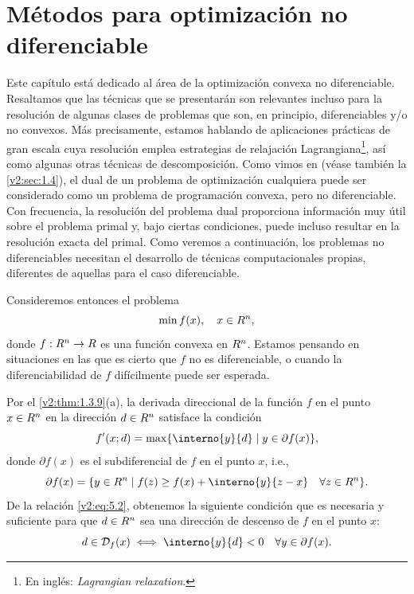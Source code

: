 
\chapter{Métodos para optimización no diferenciable}
\label{v2:chap:5}

Este capítulo está dedicado al área de la optimización convexa no diferenciable. Resaltamos que las técnicas que se presentarán son relevantes incluso para la resolución de algunas clases de problemas que son, en principio, diferenciables y/o no convexos. Más precisamente, estamos hablando de aplicaciones prácticas de gran escala cuya resolución emplea estrategias de relajación Lagrangiana\footnote{En inglés: \textit{Lagrangian relaxation}.}, así como algunas otras técnicas de descomposición. Como vimos en \cite[Capítulo 5]{SolodovVol1} (véase también la \cref{v2:sec:1.4}), el dual de un problema de optimización cualquiera puede ser considerado como un problema de programación convexa, pero no diferenciable. Con frecuencia, la resolución del problema dual proporciona información muy útil sobre el problema primal y, bajo ciertas condiciones, puede incluso resultar en la resolución exacta del primal. Como veremos a continuación, los problemas no diferenciables necesitan el desarrollo de técnicas computacionales propias, diferentes de aquellas para el caso diferenciable.

Consideremos entonces el problema
\begin{equation}
    \min f(x), \quad x \in R^n,
    \label{v2:eq:5.1}
\end{equation}
donde $f : R^n \to R$ es una función convexa en $R^n$. Estamos pensando en situaciones en las que es cierto que $f$ no es diferenciable, o cuando la diferenciabilidad de $f$ difícilmente puede ser esperada.

Por el \cref{v2:thm:1.3.9}(a), la derivada direccional de la función $f$ en el punto $x \in R^n$ en la dirección $d \in R^n$ satisface la condición
\begin{equation}
    f'(x; d) = \max \{ \interno{y}{d} \mid y \in \partial f(x) \},
    \label{v2:eq:5.2}
\end{equation}
donde $\partial f(x)$ es el subdiferencial de $f$ en el punto $x$, i.e.,
\[
    \partial f(x) = \{ y \in \Rn \mid f(z) \ge f(x) + \interno{y}{z - x} \quad \forall z \in \Rn \}.
\]
De la relación \eqref{v2:eq:5.2}, obtenemos la siguiente condición que es necesaria y suficiente para que $d \in R^n$ sea una dirección de descenso de $f$ en el punto $x$:
\[
    d \in \mathcal{D}_f(x) \iff \interno{y}{d} < 0 \quad \forall y \in \partial f(x).
\]


